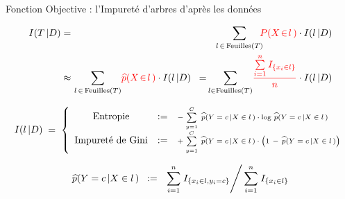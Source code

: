 \normalsize


\begin{frame}{\vskip -0.5cm \normalsize Fonction Objective : \vskip 0.05cm \Large l'Impuret\'e d'arbres d'apr\`es les donn\'ees}

\vskip -0.5cm

\begin{eqnarray*}
I(T\,\vert D)
& = &
	\!\!\!\!
	\underset{l\,\in\,\textnormal{Feuilles}(T)}{\sum}\!\!
	{\color{red}P(X \!\in\! l\,)} \cdot I(l\,\vert D)
\\
& \approx &
	\!\!\!\!
	\underset{l\,\in\,\textnormal{Feuilles}(T)}{\sum}
	{\color{red}\widehat{p}(X \!\in\! l\,)} \cdot I(l\,\vert D)
\;\; = \;\;
	\!\!\!\!
	\underset{l\in\textnormal{Feuilles}(T)}{\sum}
	{\color{red}\dfrac{\overset{n}{\underset{i=1}{\sum}}\,I_{\{x_{i} \in l\}}}{n}} \cdot I(l\,\vert D)
\end{eqnarray*}

\small
\begin{equation*}
I(l\,\vert D)
\; = \;
\left\{\begin{array}{ccl}
\textnormal{Entropie}
& := &
	\textnormal{\scriptsize$-\;\overset{C}{\underset{y=1}{\sum}}\;\,
	\widehat{p}(Y=c\,\vert X\in l\,) \cdot \log\,\widehat{p}(Y=c\,\vert X\in l\,)$}
\\
\textnormal{Impuret\'e de Gini}
& := &
	\textnormal{\scriptsize$+\;\overset{C}{\underset{y=1}{\sum}}\;\,
	\widehat{p}(Y=c\,\vert X\in l\,) \cdot
	\left(\overset{{\color{white}.}}{1}\,-\,\widehat{p}(Y=c\,\vert X\in l\,)\right)$}
\end{array}\right.
\end{equation*}

\vskip -0.5cm

\footnotesize
\begin{equation*}
\widehat{p}(Y=c\,\vert X\in l\,)
\;\; := \;\;
	\left.\overset{n}{\underset{i=1}{\sum}}\; I_{\{x_{i}\in l, y_{i} = c\}} \right\slash
	\overset{n}{\underset{i=1}{\sum}}\; I_{\{x_{i}\in l\}}
\end{equation*}

\end{frame}
\normalsize

